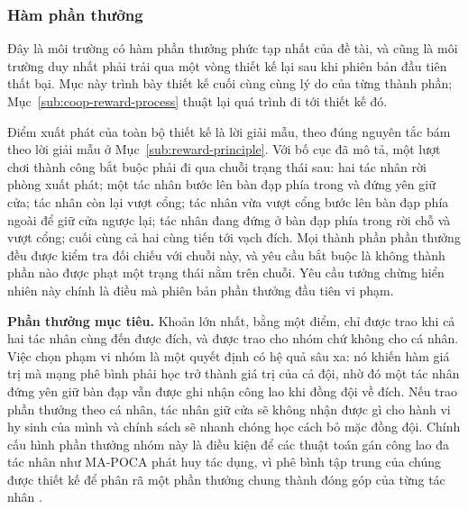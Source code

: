 \subsubsection{Hàm phần thưởng}
\indent Đây là môi trường có hàm phần thưởng phức tạp nhất của đề tài, và cũng là môi
trường duy nhất phải trải qua một vòng thiết kế lại sau khi phiên bản đầu tiên thất bại.
Mục này trình bày thiết kế cuối cùng cùng lý do của từng thành phần;
Mục~\ref{sub:coop-reward-process} thuật lại quá trình đi tới thiết kế đó.

\indent Điểm xuất phát của toàn bộ thiết kế là lời giải mẫu, theo đúng nguyên
tắc bám theo lời giải mẫu ở Mục~\ref{sub:reward-principle}. Với bố cục đã mô tả, một
lượt chơi thành công bắt buộc phải đi qua chuỗi trạng thái sau: hai tác nhân rời phòng
xuất phát; một tác nhân bước lên bàn đạp phía trong và đứng yên giữ cửa; tác nhân còn
lại vượt cổng; tác nhân vừa vượt cổng bước lên bàn đạp phía ngoài để giữ cửa ngược lại;
tác nhân đang đứng ở bàn đạp phía trong rời chỗ và vượt cổng; cuối cùng cả hai cùng tiến
tới vạch đích.
Mọi thành phần phần thưởng đều được kiểm tra đối chiếu với chuỗi này, và yêu cầu bắt
buộc là không thành phần nào được phạt một trạng thái nằm trên chuỗi. Yêu cầu tưởng
chừng hiển nhiên này chính là điều mà phiên bản phần thưởng đầu tiên vi phạm.

\indent \textbf{Phần thưởng mục tiêu.} Khoản lớn nhất, bằng một điểm, chỉ được trao khi
cả hai tác nhân cùng đến được đích, và được trao cho nhóm chứ không cho cá nhân.
Việc chọn phạm vi nhóm là một quyết định có hệ quả sâu xa: nó khiến hàm giá trị mà mạng
phê bình phải học trở thành giá trị của cả đội, nhờ đó một tác nhân đứng yên giữ bàn đạp
vẫn được ghi nhận công lao khi đồng đội về đích. Nếu trao phần thưởng theo cá nhân, tác
nhân giữ cửa sẽ không nhận được gì cho hành vi hy sinh của mình và chính sách sẽ nhanh
chóng học cách bỏ mặc đồng đội. Chính cấu hình phần thưởng nhóm này là điều kiện để các
thuật toán gán công lao đa tác nhân như MA-POCA \cite{cohen2022mapoca} phát huy tác
dụng, vì phê bình tập trung của chúng được thiết kế để phân rã một phần thưởng chung
thành đóng góp của từng tác nhân \cite{foerster2018counterfactual}.

